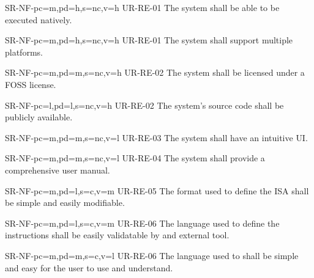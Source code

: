 \setcounter{i}{1}

\begin{softwareReq}{SR-NF-}{pc=m,pd=h,s=nc,v=h}
  {UR-RE-01}
  The system shall be able to be executed natively.
\end{softwareReq}

\begin{softwareReq}{SR-NF-}{pc=m,pd=h,s=nc,v=h}
  {UR-RE-01}
  The system shall support multiple platforms.
\end{softwareReq}

\begin{softwareReq}{SR-NF-}{pc=m,pd=m,s=nc,v=h}
  {UR-RE-02}
  The system shall be licensed under a \gls{FOSS} license.
\end{softwareReq}

\begin{softwareReq}{SR-NF-}{pc=l,pd=l,s=nc,v=h}
  {UR-RE-02}
  The system's source code shall be publicly available.
\end{softwareReq}

\begin{softwareReq}{SR-NF-}{pc=m,pd=m,s=nc,v=l}
  {UR-RE-03}
  The system shall have an intuitive \gls{UI}.
\end{softwareReq}

\begin{softwareReq}{SR-NF-}{pc=m,pd=m,s=nc,v=l}
  {UR-RE-04}
  The system shall provide a comprehensive user manual.
\end{softwareReq}

\begin{softwareReq}{SR-NF-}{pc=m,pd=l,s=c,v=m}
  {UR-RE-05}
  The format used to define the \gls{ISA} shall be simple and easily modifiable.
\end{softwareReq}

\begin{softwareReq}{SR-NF-}{pc=m,pd=l,s=c,v=m}
  {UR-RE-06}
  The language used to define the instructions shall be easily validatable by and external tool.
\end{softwareReq}

\begin{softwareReq}{SR-NF-}{pc=m,pd=m,s=c,v=l}
  {UR-RE-06}
  The language used to shall be simple and easy for the user to use and understand.
\end{softwareReq}


